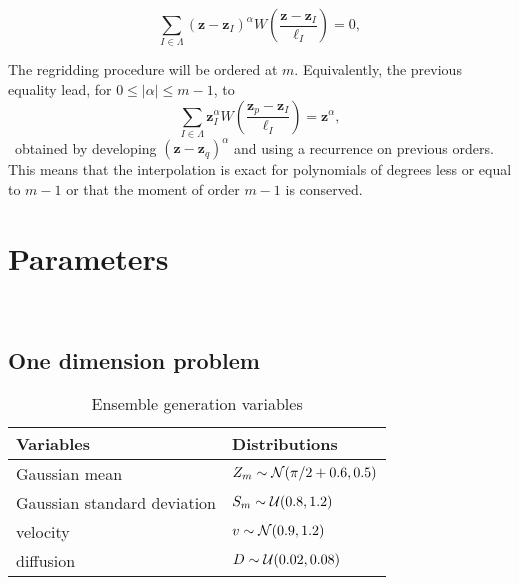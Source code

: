 \begin{equation}
    \sum_{I \in \Lambda} {(\bm z-\bm z_I)}^\alpha W \left(\frac{\bm z - \bm z_I}{\ell_I} \right) = 0, \label{eq:momentProperty}
\end{equation}

The regridding procedure will be ordered at $m$. Equivalently, the previous equality lead, for $0 \leq |\alpha| \leq m - 1$, to
\begin{equation*}
    \sum_{I \in \Lambda} \bm z_I^\alpha W \left(\frac{\bm z_p - \bm z_I}{\ell_I} \right) = \bm z^\alpha,
\end{equation*}~obtained by developing ${(\bm z-\bm z_q)}^\alpha$ and using a recurrence on previous orders. This means that the interpolation is exact for polynomials of degrees less or equal to $m-1$ or that the moment of order $m-1$ is conserved.

\section{Parameters}~\label{appendix:simulation-parameters}

\subsection{One dimension problem}
\begin{table}[htbp]
    \centering
    \caption{Ensemble generation variables}
    \begin{tabular}[t]{|l|l|}
        \hline
        Variables                   & Distributions                              \\
        \hline
        Gaussian mean               & $Z_m \sim  \mathcal{N}(\pi/2 + 0.6, 0.5)$ \\
        Gaussian standard deviation & $S_m \sim\mathcal{U}(0.8, 1.2)$       \\
        velocity                    & $v \sim \mathcal{N}(0.9, 1.2)$        \\
        diffusion                   & $D \sim \mathcal{U}(0.02, 0.08)$          \\
        \hline
    \end{tabular}
    \label{tab:ens_gen_1d}
\end{table}

